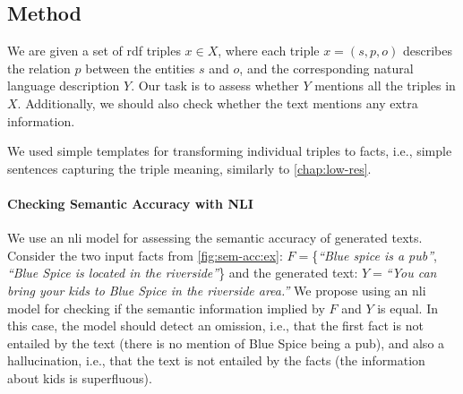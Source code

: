 \documentclass[12pt,notitlepage,a4paper,oneside,openany]{report}
\renewcommand\cite{\citep}
\begin{document}
\subsection{Method}
\label{sec:sem-acc:method}
We are given a set of \acs{rdf} triples $x \in X$, where each triple $x = (s, p, o)$ describes the relation $p$ between the entities $s$ and $o$, and the corresponding natural language description $Y$. Our task is to assess whether $Y$ mentions all the triples in $X$. Additionally, we should also check whether the text mentions any extra information.

We used simple templates for transforming individual triples to facts, i.e., simple sentences capturing the triple meaning, similarly to \autoref{chap:low-res}.



\paragraph{Checking Semantic Accuracy with NLI} We use an \ac{nli} model for assessing the semantic accuracy of generated texts. Consider the two input facts from \autoref{fig:sem-acc:ex}: $F= $\{\emph{``Blue spice is a pub''}, \emph{``Blue Spice is located in the riverside''}\} and the generated text: $Y= $\emph{``You can bring your kids to Blue Spice in the riverside area.''} We propose using an \ac{nli} model for checking if the semantic information implied by $F$ and $Y$ is equal.
In this case, the model should detect an omission, i.e., that the first fact is not entailed by the text (there is no mention of Blue Spice being a pub), and also a hallucination, i.e., that the text is not entailed by the facts (the information about kids is superfluous).
\end{document}
